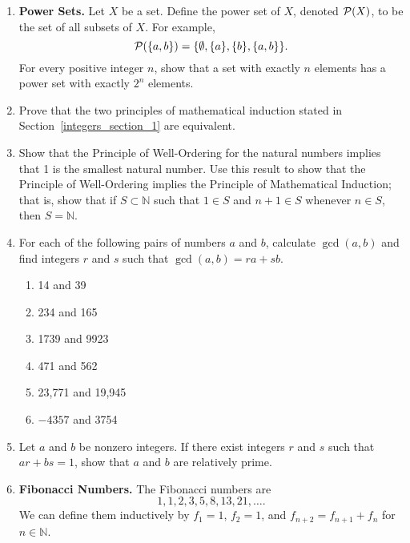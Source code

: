 {\begin{enumerate}
\item
{\bf Power Sets.} 
Let $X$ be a set.  Define the {\bfi power set\/} of $X$, denoted ${\cal P}(X)$\label{powerset}, to be the set of all subsets  of $X$.  For example,  
$$
{\cal P}( \{a, b\} ) = \{ \emptyset, \{a\}, \{b\}, \{a, b\} \}.
$$
For every positive integer $n$, show that a set with exactly $n$ elements has a power set with exactly $2^n$ elements.

\item
Prove that the two principles of mathematical induction stated in Section~\ref{integers_section_1} are equivalent. 

\item
Show that the Principle of Well-Ordering for the natural numbers implies that 1 is the smallest natural number.  Use this result to show that the Principle of Well-Ordering implies the Principle of Mathematical Induction; that is, show that if $S \subset {\mathbb N}$ such that $1 \in S$ and $n + 1 \in S$ whenever $n \in S$, then $S = {\mathbb N}$.  

\item
For each of the following pairs of numbers $a$ and $b$, calculate $\gcd(a,b)$ and find integers $r$ and $s$ such that  $\gcd(a,b) = ra + sb$. 
\begin{multicols}{2}
\begin{enumerate}

\item 
14 and 39

\item
234 and 165

\item
1739 and 9923

\item
471 and 562

\item
23,771 and 19,945

\item
$-4357$ and 3754

\end{enumerate}
\end{multicols}
 
\item
Let $a$ and $b$ be nonzero integers. If there exist integers $r$ and $s$ such that $ar +bs =1$, show that $a$ and $b$ are relatively prime.
 
 
\item
{\bf Fibonacci Numbers.}
The Fibonacci numbers are
$$
1, 1, 2, 3, 5, 8, 13, 21, \ldots.
$$
We can define them inductively by $f_1 = 1$, $f_2 = 1$, and $f_{n + 2} = f_{n + 1} + f_n$ for $n \in {\mathbb N}$. 
\begin{enumerate}
 

\end{enumerate}
\end{enumerate}}
